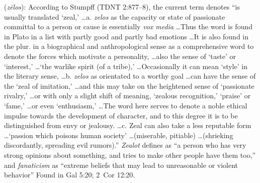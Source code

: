 \item[Fanaticism,]

(\textit{zēlos}):
According to Stumpff (TDNT 2:877--8), the current term denotes ``is usually translated `zeal,' \ldots a. \emph{zelos} as the capacity or state of passionate committal to a person or cause is essentially \emph{vox media} \ldots Thus the word is found in Plato in a list with partly good and partly bad emotions \ldots It is also found in the plur. in a biographical and anthropological sense as a comprehensive word to denote the forces which motivate a personality, \ldots also the sense of `taste' or `interest,' \ldots `the warlike spirit (of a tribe),' \ldots Occasionally it can mean `style' in the literary sense, \ldots b. \emph{zelos} as orientated to a worthy goal \ldots can have the sense of  the `zeal of imitation,' \ldots and this may take on the heightened sense of `passionate rivalry,' \ldots or with only a slight shift of meaning, `zealous recognition,' `praise' or `fame,' \ldots or even `enthusiasm,' \ldots The word here serves  to denote a noble ethical impulse towards the development of character, and to this degree it is to be distinguished from envy or jealousy. \ldots c. Zeal can also take a less reputable form \ldots `passion which poisons human society' \ldots (miserable, pitiable) \ldots (shrieking discordantly, spreading evil rumors).'' \emph{Zealot} defines as ``a person who has very strong opinions about something, and tries to make other people have them too,'' and \emph{fanaticism} as ``extreme beliefs that may lead to unreasonable or violent behavior''
Found in Gal 5:20; 2~Cor 12:20.
